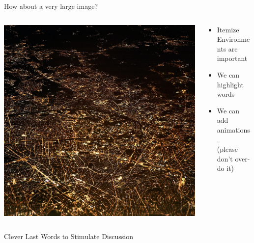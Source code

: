 \documentclass[aspectratio=169,10pt]{beamer}
\begin{document}
\begin{frame}[fragile]{How about a very large image?}

\begin{columns}
	\begin{column}{0.57\paperwidth}
		\vspace{0.5pt}
		\includegraphics[width=\linewidth, clip]{images/city}
	\end{column}
	\begin{column}[c]{0.43\paperwidth}
		\begin{itemize}
			\item Itemize Environments are important
			\item We can \alert{highlight} words
			\pause
			\item We can add animations.\\(please don't over-do it)
		\end{itemize}
	\end{column}
\end{columns}
\end{frame}

\begin{frame}[t,standout]
\Large
Clever Last Words to Stimulate Discussion
\end{frame}
\end{document}
